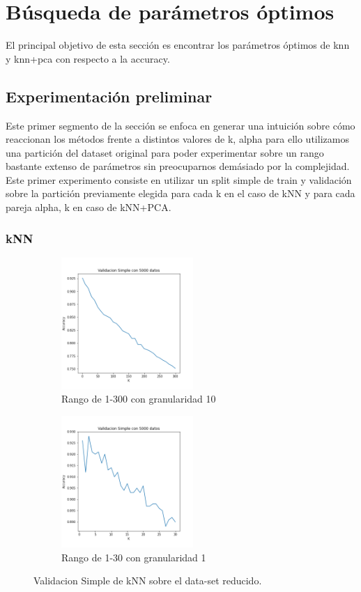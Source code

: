 
\section{Búsqueda de parámetros óptimos }

El principal objetivo de esta sección es encontrar los parámetros óptimos de knn y knn+pca con respecto a la accuracy. 

\subsection{Experimentación preliminar}
Este primer segmento de la sección se enfoca en generar una intuición sobre cómo reaccionan los métodos frente a distintos valores de k, alpha para ello utilizamos una partición del dataset original para poder experimentar sobre un rango bastante extenso de parámetros sin preocuparnos demásiado por la complejidad. Este primer experimento consiste en utilizar un split simple de train y validación sobre la partición previamente elegida para cada k en el caso de kNN y para cada pareja alpha, k en caso de kNN+PCA. 

\subsubsection{kNN}

\begin{figure}[h]
\begin{subfigure}{0.5\textwidth}
\includegraphics[width=0.9\linewidth, height=5cm]{images/validacionSimple_knnsolo.png} 
\caption{Rango de 1-300 con granularidad 10}
\label{fig:subimbar_medio1}
\end{subfigure}
\begin{subfigure}{0.5\textwidth}
\includegraphics[width=0.9\linewidth, height=5cm]{images/validacionSimple_knnsolo_Kchicos.png} 
\caption{Rango de 1-30 con granularidad 1}
\label{fig:subimbar_medio2}
\end{subfigure}
\caption{Validacion Simple de kNN sobre el data-set reducido.}
\label{knn_preliminar}%
\end{figure}

